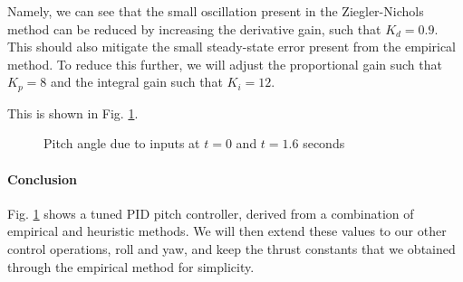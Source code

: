 \documentclass[12pt]{article}
\begin{document}
Namely, we can see that the small oscillation present in the Ziegler-Nichols method can be reduced by increasing the derivative gain, such that $K_d = 0.9$. This should also mitigate the small steady-state error present from the empirical method. To reduce this further, we will adjust the proportional gain such that $K_p = 8$ and the integral gain such that $K_i = 12$.


This is shown in Fig. \ref{fig:combined-znemp}.

\begin{figure}[H]
    \centering
    \caption{Pitch angle due to inputs at $t = 0$ and $t = 1.6$ seconds}
    \label{fig:combined-znemp}
\end{figure}


\paragraph{Conclusion}
Fig. \ref{fig:combined-znemp} shows a tuned PID pitch controller, derived from a combination of empirical and heuristic methods. We will then extend these values to our other control operations, roll and yaw, and keep the thrust constants that we obtained through the empirical method for simplicity.
\end{document}
